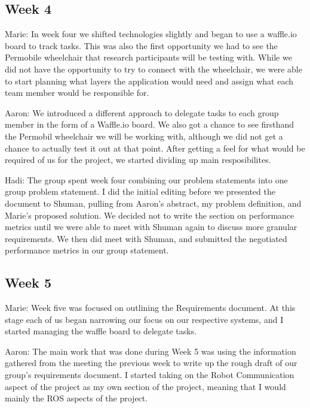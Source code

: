 \documentclass[onecolumn, draftclsnofoot,10pt, compsoc]{IEEEtran}
\begin{document}
\subsection{Week 4}
Marie: In week four we shifted technologies slightly and began to use a waffle.io board to track tasks. This was also the first opportunity we had to see the Permobile wheelchair that research participants will be testing with. While we did not have the opportunity to try to connect with the wheelchair, we were able to start planning what layers the application would need and assign what each team member would be responsible for.\par

Aaron: We introduced a different approach to delegate tasks to each group member in the form of a Waffle.io board. We also got a chance to see firsthand the Permobil wheelchair we will be working with, although we did not get a chance to actually test it out at that point. After getting a feel for what would be required of us for the project, we started dividing up main resposibilites.\par

Hadi: The group spent week four combining our problem statements into one group problem statement. I did the initial editing before we presented the document to Shuman, pulling from Aaron's abstract, my problem definition, and Marie's proposed solution. We decided not to write the section on performance metrics until we were able to meet with Shuman again to discuss more granular requirements. We then did meet with Shuman, and submitted the negotiated performance metrics in our group statement. 

\subsection{Week 5}
Marie: Week five was focused on outlining the Requirements document. At this stage each of us began narrowing our focus on our respective systems, and I started managing the waffle board to delegate tasks.\par

Aaron: The main work that was done during Week 5 was using the information gathered from the meeting the previous week to write up the rough draft of our group's requirements document. I started taking on the Robot Communication aspect of the project as my own section of the project, meaning that I would mainly the ROS aspects of the project.\par
\end{document}
